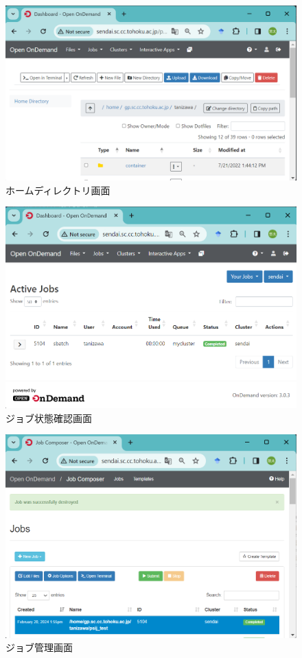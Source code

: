 \begin{figure}[t]
    \centering
    \includegraphics[width=120mm]{./fig/homedirectory.png}
    \caption{ホームディレクトリ画面}
    \label{homedirectory}
\end{figure}

\begin{figure}[t]
    \centering
    \includegraphics[width=120mm]{./fig/activejobs.png}
    \caption{ジョブ状態確認画面}
    \label{activejobs}
\end{figure}


\begin{figure}[b]
    \centering
    \includegraphics[width=120mm]{./fig/jobcomposer.png}
    \caption{ジョブ管理画面}
    \label{jobcomposer}
\end{figure}


